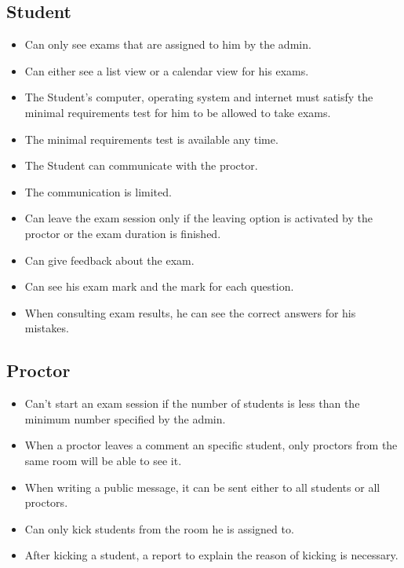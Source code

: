 \documentclass[]{uc2pfecaneva}
\begin{document}
    \raggedright\subsection{Student}
    \begin{itemize}
        \item Can only see exams that are assigned to him by the admin.
        \item Can either see a list view or a calendar view for his exams.
        \item The Student’s computer, operating system and internet  must satisfy the minimal requirements test for him to be allowed to take exams.
        \item The  minimal requirements test is available any time.
        \item The Student can communicate with the proctor.
        \item The communication is limited.
        \item Can leave the exam session only if the leaving option is activated by the proctor or the exam duration is finished.
        \item Can give feedback about the exam.
        \item Can see his exam mark and the mark for each question.
        \item When consulting exam results, he can see the correct answers for his mistakes.
    \end{itemize}

    \raggedright\subsection{Proctor}
    \begin{itemize}
        \item Can’t start an exam session if the number of students is less than the minimum number specified by the admin.
        \item When a proctor leaves a comment an specific student, only proctors from the same room will be able to see it.
        \item When writing a public message, it can be sent either to all students or all proctors.
        \item Can only kick students from the room he is assigned to.
        \item After kicking a student, a report to explain the reason of kicking is necessary.
    \end{itemize}
\end{document}
